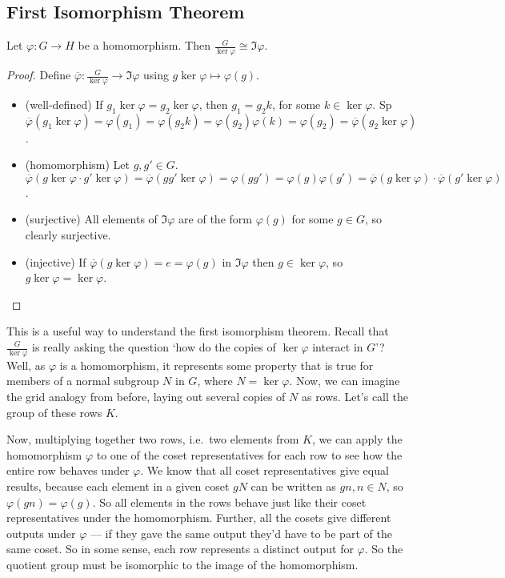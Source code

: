 \subsection{First Isomorphism Theorem}
\begin{theorem}
	Let \(\varphi: G \to H\) be a homomorphism.
	Then \(\frac{G}{\ker \varphi} \cong \Im \varphi\).
\end{theorem}
\begin{proof}
	Define \(\overline \varphi: \frac{G}{\ker \varphi} \to \Im \varphi\) using \(g \ker \varphi \mapsto \varphi(g)\).
	\begin{itemize}
		\item (well-defined) If \(g_1 \ker \varphi = g_2 \ker \varphi\), then \(g_1 = g_2k\), for some \(k \in \ker \varphi\).
		      Sp \(\overline\varphi(g_1 \ker \varphi) = \varphi(g_1) = \varphi(g_2k) = \varphi(g_2)\varphi(k) = \varphi(g_2) = \overline\varphi(g_2 \ker \varphi)\).
		\item (homomorphism) Let \(g, g' \in G\).
		      \(\overline\varphi(g \ker \varphi \cdot g' \ker \varphi) = \overline\varphi(gg' \ker \varphi) = \varphi(gg') = \varphi(g)\varphi(g') = \overline\varphi(g\ker\varphi) \cdot \overline\varphi(g'\ker\varphi)\).
		\item (surjective) All elements of \(\Im \varphi\) are of the form \(\varphi(g)\) for some \(g \in G\), so clearly surjective.
		\item (injective) If \(\overline\varphi(g \ker \varphi) = e = \varphi(g)\) in \(\Im \varphi\) then \(g \in \ker \varphi\), so \(g \ker \varphi = \ker \varphi\).
	\end{itemize}
\end{proof}
This is a useful way to understand the first isomorphism theorem.
Recall that \(\frac{G}{\ker \varphi}\) is really asking the question `how do the copies of \(\ker \varphi\) interact in \(G\)'? Well, as \(\varphi\) is a homomorphism, it represents some property that is true for members of a normal subgroup \(N\) in \(G\), where \(N = \ker \varphi\).
Now, we can imagine the grid analogy from before, laying out several copies of \(N\) as rows.
Let's call the group of these rows \(K\).

Now, multiplying together two rows, i.e.\ two elements from \(K\), we can apply the homomorphism \(\varphi\) to one of the coset representatives for each row to see how the entire row behaves under \(\varphi\).
We know that all coset representatives give equal results, because each element in a given coset \(gN\) can be written as \(gn, n \in N\), so \(\varphi(gn) = \varphi(g)\).
So all elements in the rows behave just like their coset representatives under the homomorphism.
Further, all the cosets give different outputs under \(\varphi\) --- if they gave the same output they'd have to be part of the same coset.
So in some sense, each row represents a distinct output for \(\varphi\).
So the quotient group must be isomorphic to the image of the homomorphism.

